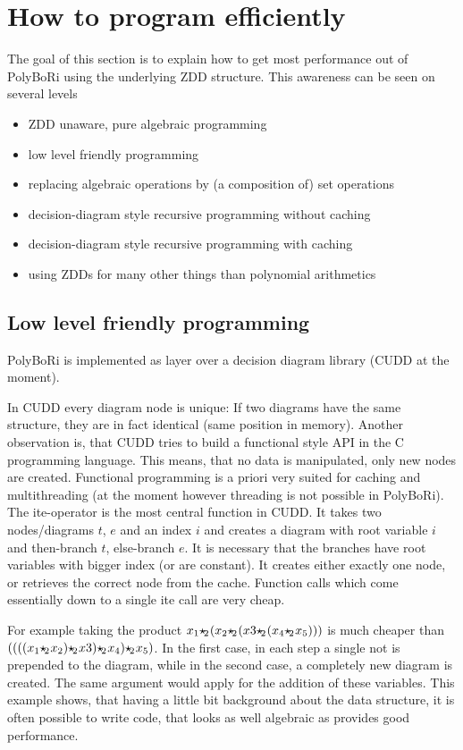 \documentclass[]{article}
\newcommand{\PolyBoRi}{{\sc PolyBoRi}\xspace}
\newcommand{\CUDD}{{CUDD}\xspace}
\newcommand{\ite}{{ite}\xspace}
\providecommand{\boolemult}{\ensuremath{{\star\hspace{-.15em}_2\hspace{.05em}}}\xspace}
\newcounter{thm}
\begin{document}

\section{How to program efficiently}
The goal of this section is to explain how to get most performance out of \PolyBoRi using the underlying ZDD structure.
This awareness can be seen on several levels
\begin{itemize}
    \item ZDD unaware, pure algebraic programming 
    \item low level friendly programming
    \item replacing algebraic operations by (a composition of) set operations
    \item decision-diagram style recursive programming without caching
    \item decision-diagram style recursive programming with caching
    \item using ZDDs for many other things than polynomial arithmetics
\end{itemize}
\subsection{Low level friendly programming}
\label{low-level-friendly}
\PolyBoRi is implemented as layer over a decision diagram library (\CUDD at the moment).

In \CUDD every diagram node is unique: If two diagrams have the same structure, they are in fact identical (same position in memory).
Another observation is, that \CUDD tries to build a functional style API in the C programming language. This means, that no data is manipulated, only new nodes are created.
Functional programming is a priori very suited for caching and multithreading (at the moment however threading is not possible in \PolyBoRi).
The \ite-operator is the most central function in CUDD. It takes two nodes/diagrams $t$, $e$ and an index $i$ and creates a diagram with root variable $i$ and
then-branch $t$, else-branch $e$. It is necessary that the branches have root variables with bigger index (or are constant).
It creates either exactly one node, or retrieves the correct node from the cache.
Function calls which come essentially down to a single \ite call are very cheap.

For example taking the product $x_1 \boolemult (x_2\boolemult(x3\boolemult (x_4\boolemult x_5)))$ is much cheaper than $((((x_1 \boolemult x_2)\boolemult x3)\boolemult x_4)\boolemult x_5)$.
In the first case, in each step a single not is prepended to the diagram, while in the second case, a completely new diagram is created.
The same argument would apply for the addition of these variables.
This example shows, that having a little bit background about the data structure, it is often possible to write code, that looks as well algebraic as provides good performance.
\end{document}
